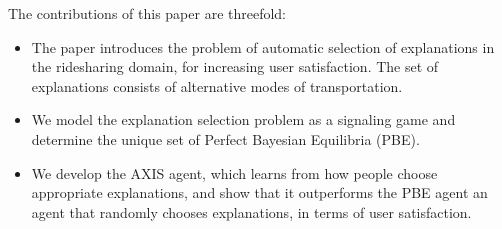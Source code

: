 \documentclass[letterpaper]{article} %
\begin{document}
The contributions of this paper are threefold:
\begin{itemize}
    \item The paper introduces the problem of automatic selection of explanations in the ridesharing domain, for increasing user satisfaction. The set of explanations consists of alternative modes of transportation.
    \item We model the explanation selection problem as a signaling game and determine the unique set of Perfect Bayesian Equilibria (PBE).
    \item We develop the AXIS agent, which learns from how people choose appropriate explanations, and show that it outperforms the PBE agent an agent that randomly chooses explanations, in terms of user satisfaction.
\end{itemize}
\end{document}
